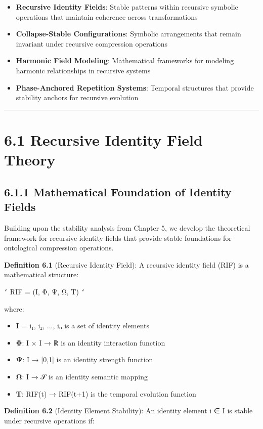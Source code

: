 \begin{itemize}
\item \textbf{Recursive Identity Fields}: Stable patterns within recursive symbolic operations that maintain coherence across transformations
\item \textbf{Collapse-Stable Configurations}: Symbolic arrangements that remain invariant under recursive compression operations
\item \textbf{Harmonic Field Modeling}: Mathematical frameworks for modeling harmonic relationships in recursive systems
\item \textbf{Phase-Anchored Repetition Systems}: Temporal structures that provide stability anchors for recursive evolution
\end{itemize}

\hrule

\section{6.1 Recursive Identity Field Theory}

\subsection{6.1.1 Mathematical Foundation of Identity Fields}

Building upon the stability analysis from Chapter 5, we develop the theoretical framework for recursive identity fields that provide stable foundations for ontological compression operations.

\textbf{Definition 6.1} (Recursive Identity Field): A recursive identity field (RIF) is a mathematical structure:

\texttt{`}
RIF = (I, Φ, Ψ, Ω, T)
\texttt{`}

where:
\begin{itemize}
\item \textbf{I} = {i₁, i₂, ..., iₙ} is a set of identity elements
\item \textbf{Φ}: I × I → ℝ is an identity interaction function
\item \textbf{Ψ}: I → [0,1] is an identity strength function
\item \textbf{Ω}: I → 𝒮 is an identity semantic mapping
\item \textbf{T}: RIF(t) → RIF(t+1) is the temporal evolution function
\end{itemize}

\textbf{Definition 6.2} (Identity Element Stability): An identity element i ∈ I is stable under recursive operations if:


